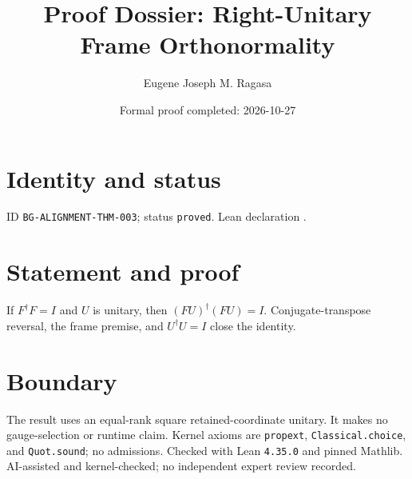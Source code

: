 \documentclass[11pt]{article}
\title{Proof Dossier: Right-Unitary Frame Orthonormality}\author{Eugene Joseph M. Ragasa}\date{Formal proof completed: 2026-10-27}
\begin{document}
\maketitle
\section{Identity and status}
ID \texttt{BG-ALIGNMENT-THM-003}; status \texttt{proved}. Lean declaration .
\section{Statement and proof}
If $F^\dagger F=I$ and $U$ is unitary, then $(FU)^\dagger(FU)=I$. Conjugate-transpose reversal, the frame premise, and $U^\dagger U=I$ close the identity.
\section{Boundary}
The result uses an equal-rank square retained-coordinate unitary. It makes no gauge-selection or runtime claim. Kernel axioms are \texttt{propext}, \texttt{Classical.choice}, and \texttt{Quot.sound}; no admissions. Checked with Lean \texttt{4.35.0} and pinned Mathlib. AI-assisted and kernel-checked; no independent expert review recorded.
\end{document}
